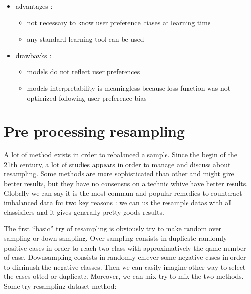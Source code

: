 \documentclass[
]{report}
\providecommand{\tightlist}{%
  \setlength{\itemsep}{0pt}\setlength{\parskip}{0pt}}
\begin{document}
\begin{itemize}
  \begin{itemize}
  \tightlist
  \item
    advantages :

    \begin{itemize}
    \tightlist
    \item
      not necessary to know user preference biases at learning time
    \item
      any standard learning tool can be used
    \end{itemize}
  \item
    drawbavks :

    \begin{itemize}
    \tightlist
    \item
      models do not reflect user preferences
    \item
      models interpretability is meaningless because loss function was not optimized following user preference bias
    \end{itemize}
  \end{itemize}
\end{itemize}

\hypertarget{pre-processing-resampling}{%
\section{Pre processing resampling}\label{pre-processing-resampling}}

A lot of method exists in order to rebalanced a sample. Since the begin of the 21th century, a lot of studies appears in order to manage and discuss about resampling. Some methods are more sophisticated than other and might give better results, but they have no consensus on a technic whive have better results. Globally we can say it is the most commun and popular remedies to counteract imbalanced data for two key reasons : we can us the resample datas with all classisfiers and it gives generally pretty goods results.

The first ``basic'' try of resampling is obviously try to make random over sampling or down sampling. Over sampling consists in duplicate randomly positive cases in order to reach two class with approximatively the qame number of case. Downsampling consists in randomly enlever some negative cases in order to diminush the negative classes. Then we can easily imagine other way to select the cases otted or duplicate. Moreover, we can mix try to mix the two methods. Some try
resampling dataset method:
\end{document}
